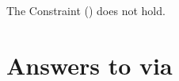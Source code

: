 \documentclass[10pt]{article}
\begin{document}
\begin{note}
  \begin{thesis}
    The Constraint (\issueInclusion{}) does not hold.
  \end{thesis}
\end{note}



\begin{comment}
  For \issueInclusion{} to fail, need a counterexample.
  Though this is more involved.

  \begin{enumerate}
  \item
    Sense of `why' and `how'.
  \item
    Answers to \qWhy{}.
  \item
    Way to identify \fingfr{}.
  \end{enumerate}
\end{comment}

\begin{comment}
  Not really about the result.
  Argument.
  Fairly technical.
  Framework so it's possible to create a direct argument.
  Only issue is whether the definitions, ideas, etc.\ work out.
  I.e.\ whether you agree.

  Stress this point.
  Well, what do I want to stress?
  `Makes sense'.
  So, think of epistemology.
  Various cases, intuition about whether knows.
  Intuition is taken as input for creating theory.
  This is the sort of Rawlsian reflective equilibrium.

  Important constraint.
  Should not be the case framework presupposes answer.
  See how these definitions come together.
\end{comment}



\vfill


\newpage

\section{Answers to \qWhy{} via }
\label{sec:answers-qwhy}
\end{document}
